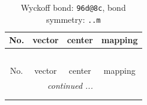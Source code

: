\documentclass[fleqn,8pt]{jsarticle}
\begin{document}
\renewcommand{\arraystretch}{1.2}
\begin{longtable}{cccc}
\caption{Wyckoff bond: {\tt 96d@8c}, bond symmetry: {\tt ..m}}
 \\
 \hline \hline
No. & vector & center & mapping \\ \hline \endfirsthead

\multicolumn{3}{l}{\tablename\ \thetable{}} \\
 \hline \hline
No. & vector & center & mapping \\ \hline \endhead

 \hline \hline
\multicolumn{3}{r}{\footnotesize\it continued ...} \\ \endfoot

 \hline \hline
\multicolumn{3}{r}{} \\ \endlastfoot


\end{longtable}
\end{document}
